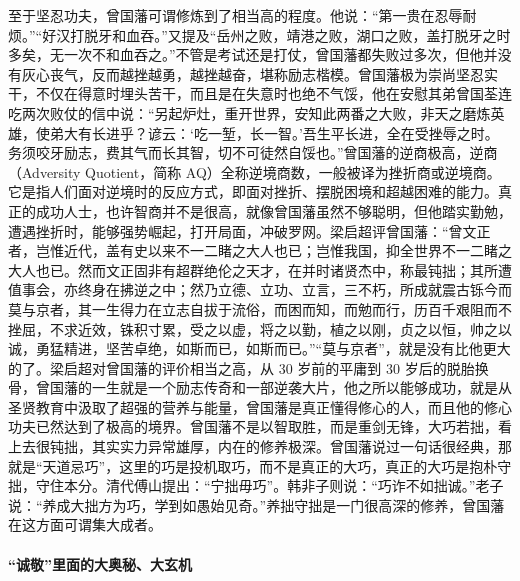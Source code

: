 至于坚忍功夫，曾国藩可谓修炼到了相当高的程度。他说：“第一贵在忍辱耐烦。”“好汉打脱牙和血吞。”又提及“岳州之败，靖港之败，湖口之败，盖打脱牙之时多矣，无一次不和血吞之。”不管是考试还是打仗，曾国藩都失败过多次，但他并没有灰心丧气，反而越挫越勇，越挫越奋，堪称励志楷模。曾国藩极为崇尚坚忍实干，不仅在得意时埋头苦干，而且是在失意时也绝不气馁，他在安慰其弟曾国荃连吃两次败仗的信中说：“另起炉灶，重开世界，安知此两番之大败，非天之磨炼英雄，使弟大有长进乎？谚云：‘吃一堑，长一智。’吾生平长进，全在受挫辱之时。务须咬牙励志，费其气而长其智，切不可徒然自馁也。”曾国藩的逆商极高，逆商（Adversity Quotient，简称 AQ）全称逆境商数，一般被译为挫折商或逆境商。它是指人们面对逆境时的反应方式，即面对挫折、摆脱困境和超越困难的能力。真正的成功人士，也许智商并不是很高，就像曾国藩虽然不够聪明，但他踏实勤勉，遭遇挫折时，能够强势崛起，打开局面，冲破罗网。梁启超评曾国藩：“曾文正者，岂惟近代，盖有史以来不一二睹之大人也已；岂惟我国，抑全世界不一二睹之大人也已。然而文正固非有超群绝伦之天才，在并时诸贤杰中，称最钝拙；其所遭值事会，亦终身在拂逆之中；然乃立德、立功、立言，三不朽，所成就震古铄今而莫与京者，其一生得力在立志自拔于流俗，而困而知，而勉而行，历百千艰阻而不挫屈，不求近效，铢积寸累，受之以虚，将之以勤，植之以刚，贞之以恒，帅之以诚，勇猛精进，坚苦卓绝，如斯而已，如斯而已。”“莫与京者”，就是没有比他更大的了。梁启超对曾国藩的评价相当之高，从 30 岁前的平庸到 30 岁后的脱胎换骨，曾国藩的一生就是一个励志传奇和一部逆袭大片，他之所以能够成功，就是从圣贤教育中汲取了超强的营养与能量，曾国藩是真正懂得修心的人，而且他的修心功夫已然达到了极高的境界。曾国藩不是以智取胜，而是重剑无锋，大巧若拙，看上去很钝拙，其实实力异常雄厚，内在的修养极深。曾国藩说过一句话很经典，那就是“天道忌巧”，这里的巧是投机取巧，而不是真正的大巧，真正的大巧是抱朴守拙，守住本分。清代傅山提出：“宁拙毋巧”。韩非子则说：“巧诈不如拙诚。”老子说：“养成大拙方为巧，学到如愚始见奇。”养拙守拙是一门很高深的修养，曾国藩在这方面可谓集大成者。

\paragraph{“诚敬”里面的大奥秘、大玄机}

